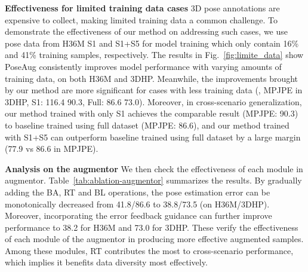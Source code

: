 \documentclass[final]{cvpr}
\newcommand{\myparagraph}[1]{{ \noindent \bf #1}}
\begin{document}
\myparagraph{Effectiveness for limited training data cases}
3D pose annotations are expensive to collect, making limited training data a common challenge.
To demonstrate the effectiveness of our method on addressing such cases,  we use pose data from H36M S1 and S1+S5 for model training which only contain 16\% and 41\% training samples, respectively. 
The results in Fig.~\ref{fig:limite_data} show PoseAug consistently improves model performance with varying amounts of training data, on both H36M and 3DHP. 
Meanwhile, the improvements brought by our method are more significant for cases with less training data (\eg, MPJPE in 3DHP, S1: 116.4  90.3, Full: 86.6  73.0). 
Moreover, in cross-scenario generalization, our method trained with only S1 achieves the comparable result (MPJPE: 90.3) to baseline trained using full dataset (MPJPE: 86.6), and our method trained with S1+S5 can outperform baseline trained using full dataset by a large margin (77.9 vs 86.6 in MPJPE). 

\myparagraph{Analysis on the augmentor}
We then check the effectiveness of each module in augmentor.
Table~\ref{tab:ablation-augmentor} summarizes the results. 
By gradually adding the BA, RT and BL operations, the pose estimation error can  be monotonically decreased from 41.8/86.6 to 38.8/73.5 (on H36M/3DHP).
Moreover, incorporating the error feedback guidance can further improve performance to 38.2 for H36M and 73.0 for 3DHP. 
These verify the effectiveness of each module of the augmentor in producing more effective augmented samples. 
Among these modules, RT contributes the most to cross-scenario performance, which implies it benefits data diversity most effectively.
\end{document}

